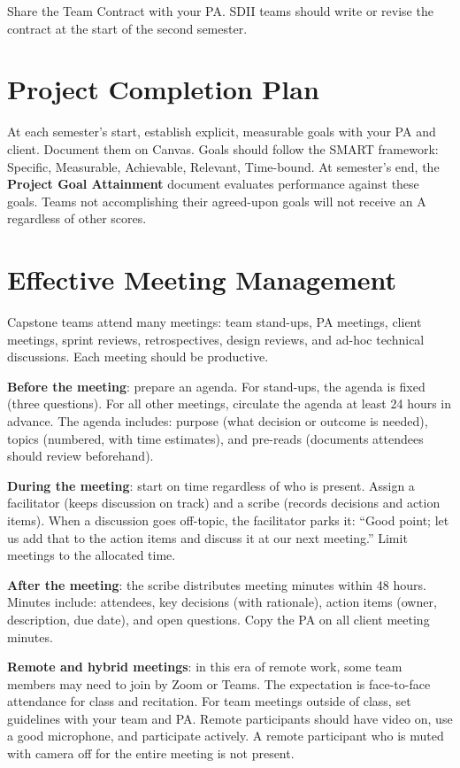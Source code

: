 Share the Team Contract with your PA. SDII teams should write or revise the contract at the start of the second semester.

\section{Project Completion Plan}
At each semester's start, establish explicit, measurable goals with your PA and client. Document them on Canvas. Goals should follow the SMART framework: Specific, Measurable, Achievable, Relevant, Time-bound. At semester's end, the \textbf{Project Goal Attainment} document evaluates performance against these goals. Teams not accomplishing their agreed-upon goals will not receive an A regardless of other scores.

\section{Effective Meeting Management}
Capstone teams attend many meetings: team stand-ups, PA meetings, client meetings, sprint reviews, retrospectives, design reviews, and ad-hoc technical discussions. Each meeting should be productive.

\textbf{Before the meeting}: prepare an agenda. For stand-ups, the agenda is fixed (three questions). For all other meetings, circulate the agenda at least 24 hours in advance. The agenda includes: purpose (what decision or outcome is needed), topics (numbered, with time estimates), and pre-reads (documents attendees should review beforehand).

\textbf{During the meeting}: start on time regardless of who is present. Assign a facilitator (keeps discussion on track) and a scribe (records decisions and action items). When a discussion goes off-topic, the facilitator parks it: ``Good point; let us add that to the action items and discuss it at our next meeting.'' Limit meetings to the allocated time.

\textbf{After the meeting}: the scribe distributes meeting minutes within 48 hours. Minutes include: attendees, key decisions (with rationale), action items (owner, description, due date), and open questions. Copy the PA on all client meeting minutes.

\textbf{Remote and hybrid meetings}: in this era of remote work, some team members may need to join by Zoom or Teams. The expectation is face-to-face attendance for class and recitation. For team meetings outside of class, set guidelines with your team and PA. Remote participants should have video on, use a good microphone, and participate actively. A remote participant who is muted with camera off for the entire meeting is not present.

